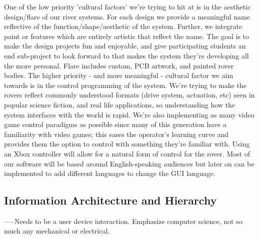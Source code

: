 \documentclass[a4paper, 10pt]{article}
\begin{document}
	One of the low priority 'cultural factors' we're trying to hit at is in the aesthetic design/flare of our river systems. For each design we provide a meaningful name reflective of the function/shape/aesthetic of the system. Further, we integrate paint or features which are entirely artistic that reflect the name. The goal is to make the design projects fun and enjoyable, and give participating students an end sub-project to look forward to that makes the system they're developing all the more personal. Flare includes custom, PCB artwork, and painted rover bodies. 
The higher priority - and more meaningful - cultural factor we aim towards is in the control programming of the system. We're trying to make the rovers reflect commonly understood formats (drive system, actuation, etc) seen in popular science fiction, and real life applications, so understanding how the system interfaces with the world is rapid. We're also implementing as many video game control paradigms as possible since many of this generation have a familiarity with video games; this eases the operator's learning curve and provides them the option to control with something they're familiar with. 
Using an Xbox controller will allow for a natural form of control for the rover. Most of our software will be based around English-speaking audiences but later on can be implemented to add different languages to change the GUI language.


	\subsection{Information Architecture and Hierarchy}
	-----Needs to be a user device interaction. Emphasize computer science, not so much any mechanical or  electrical.	
	
\end{document}
